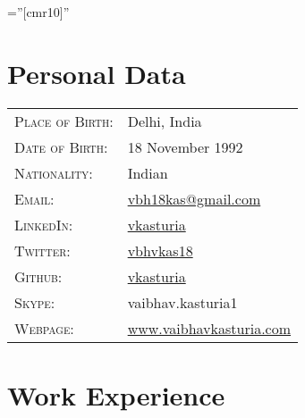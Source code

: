 \documentclass[a4paper,10pt]{article} %
\begin{document}
\pagestyle{empty} %

\font\fb=''[cmr10]'' %


\par{\bigskip\par} %

\section{Personal Data}

\begin{tabular}{ll}
\textsc{Place of Birth:} & Delhi, India \\ 
\textsc{Date of Birth:} & 18 November 1992 \\
\textsc{Nationality:} & Indian\\
\textsc{Email:} & \href{mailto:vbh18kas@gmail.com}{vbh18kas@gmail.com} \\
\textsc{LinkedIn:} & \href{https://www.linkedin.com/in/vkasturia/}{vkasturia} \\
\textsc{Twitter:} & \href{https://twitter.com/vbhvkas18}{vbhvkas18} \\
\textsc{Github:} & \href{https://github.com/vkasturia}{vkasturia} \\
\textsc{Skype:} & vaibhav.kasturia1 \\
\textsc{Webpage:} & \href{https://www.vaibhavkasturia.com}{www.vaibhavkasturia.com}
\end{tabular}


\section{Work Experience}
\end{document}
